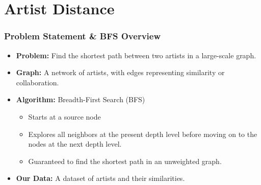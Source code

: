 \documentclass{beamer}
\begin{document}
\section{Artist Distance}

\begin{frame}[fragile]
    \frametitle{Problem Statement \& BFS Overview}

    \begin{itemize}
        \item \textbf{Problem:} Find the shortest path between two artists in a large-scale graph.
    \end{itemize}
    \begin{itemize}
        \item \textbf{Graph:} A network of artists, with edges representing similarity or collaboration.
    \end{itemize}
    \begin{itemize}
        \item \textbf{Algorithm:} Breadth-First Search (BFS)
        \begin{itemize}
            \item Starts at a source node
            \item Explores all neighbors at the present depth level before moving on to the nodes at the next depth level.
            \item Guaranteed to find the shortest path in an unweighted graph.
        \end{itemize}
    \end{itemize}
    \begin{itemize}
        \item \textbf{Our Data:} A dataset of artists and their similarities.
    \end{itemize}
\end{frame}
\end{document}
